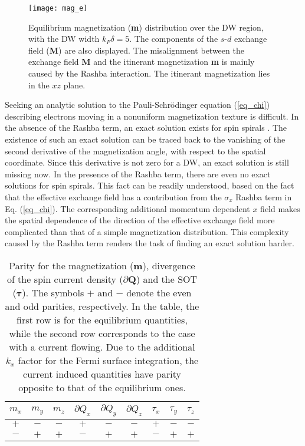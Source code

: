 \documentclass[12pt]{iopart}
\begin{document}
\begin{figure}\centering
\begin{minipage}[c]{0.5\linewidth}
\texttt{[image: mag\_e]}
\end{minipage}
\caption{Equilibrium magnetization (\textbf{m}) distribution over the DW region, with the DW width $k_F\delta = 5$. The components of the $s$-$d$ exchange field (\textbf{M}) are also displayed. The misalignment between the exchange field \textbf{M} and the itinerant magnetization \textbf{m} is mainly caused by the Rashba interaction. The itinerant magnetization lies in the $xz$ plane.}
\label{mag}
\end{figure}

Seeking an analytic solution to the Pauli-Schr\"{o}dinger equation (\ref{eq_chi}) describing electrons moving in a nonuniform magnetization texture is difficult. In the absence of the Rashba term, an exact solution exists for spin spirals \cite{Calvo}. The existence of such an exact solution can be traced back to the vanishing of the second derivative of the magnetization angle, with respect to the spatial coordinate. Since this derivative is not zero for a DW, an exact solution is still missing now. In the presence of the Rashba term, there are even no exact solutions for spin spirals. This fact can be readily understood, based on the fact that the effective exchange field has a contribution from the $\sigma_x$ Rashba term in Eq. (\ref{eq_chi}). The corresponding additional momentum dependent $x$ field makes the spatial dependence of the direction of the effective exchange field more complicated than that of a simple magnetization distribution. This complexity caused by the Rashba term renders the task of finding an exact solution harder.

\begin{table}[htb]
\begin{center}
\begin{tabular}{*{8}{c|}c}
\hline\hline
$m_x$ & $m_y$ & $m_z$ & $\partial Q_x$&$\partial Q_y$& $\partial Q_z$ & $\tau_x$ & $\tau_y$ & $\tau_z$
\\\hline\hline
$+$ & $-$ & $-$ & $+$ & $-$ & $-$ & $+$ & $-$ & $-$
\\\hline
$-$ & $+$ & $+$ & $-$ & $+$ & $+$ & $-$ & $+$ & $+$
\\\hline\hline
\end{tabular}
\caption{Parity for the magnetization ($\textbf{m}$), divergence of the spin current density ($\partial \textbf{Q}$) and the SOT ($\bm {\tau}$). The symbols $+$ and $-$ denote the even and odd parities, respectively. In the table, the first row is for the equilibrium quantities, while the second row corresponds to the case with a current flowing. Due to the additional $k_x$ factor for the Fermi surface integration, the current induced quantities have parity opposite to that of the equilibrium ones.}
\label{parity}
\end{center}
\end{table}
\end{document}
